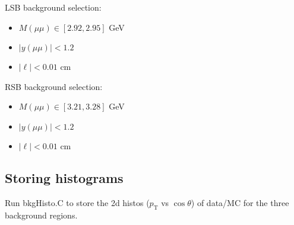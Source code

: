 \documentclass{article}
\newcommand{\pt}{p_\text{T}}
\newcommand{\cost}{\cos\theta}
\begin{document}
LSB background selection:
\begin{itemize}
\item $M(\mu\mu)\in[2.92,2.95]$ GeV
\item $|y(\mu\mu)|<1.2$
\item $|\ell| < 0.01$ cm
\end{itemize}

RSB background selection:
\begin{itemize}
\item $M(\mu\mu)\in[3.21,3.28]$ GeV
\item $|y(\mu\mu)|<1.2$
\item $|\ell| < 0.01$ cm
\end{itemize}

\subsection{Storing histograms}

Run bkgHisto.C to store the 2d histos ($\pt$ vs $\cost$) of data/MC for the three background regions.
\end{document}
